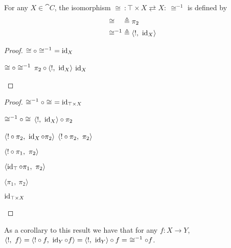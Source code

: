 \begin{lemma}\label{lemma:prod-term-iso}
  For any $X\in\cat{C}$, the isomorphism ${\cong~:\top\times X\rightleftarrows X :~\cong^{-1}}$ is defined by
  \begin{align*}
    \cong^{\phantom{-1}} & \triangleq \pi_2 \\
    \cong^{-1} & \triangleq \langle !,~\operatorname{id}_X \rangle
  \end{align*}

  \begin{proof}[Proof] $\cong\circ\cong^{-1}~= \operatorname{id}_X$
    \begin{itemize}
      \step $\cong\circ\cong^{-1}$
      \step[=] $\pi_2\circ\langle !,~\operatorname{id}_X\rangle$
      \step[=] $\operatorname{id}_X$
        \qedhere
    \end{itemize}
  \end{proof}

  \begin{proof}[Proof]$\cong^{-1}\circ\cong~= \operatorname{id}_{\top\times X}$
    \begin{itemize}
      \step $\cong^{-1}\circ\cong$
      \step[=] $\langle !,~\operatorname{id}_X\rangle\circ\pi_2$

      \step[=] $\langle !\circ\pi_2,~\operatorname{id}_X\circ\pi_2\rangle$
      \step[=] $\langle !\circ\pi_2,~\pi_2\rangle$

        \marginnote{\Def-$\id$}

      \step[=] $\langle !\circ\pi_1,~\pi_2\rangle$

      \step[=] $\langle \operatorname{id}_\top\circ\pi_1,~\pi_2\rangle$

      \step[=] $\langle \pi_1,~\pi_2\rangle$
        \marginnote{\Def-$\id$}

      \step[=] $\operatorname{id}_{\top\times X}$
        \qedhere

    \end{itemize}
  \end{proof}
\end{lemma}

As a corollary to this result we have that for any $f : X\to Y$, $\langle !,~f\rangle = \langle !\circ f,~\operatorname{id}_Y\circ f\rangle = \langle !,~\operatorname{id}_Y\rangle\circ f =~\cong^{-1}\circ f$.\\[1em]

